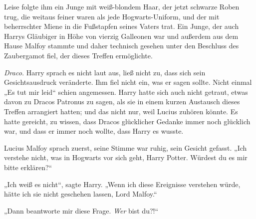 Leise folgte ihm ein Junge mit weiß-blondem Haar, der jetzt schwarze Roben trug, die weitaus feiner waren als jede Hogwarts-Uniform, und der mit beherrschter Miene in die Fußstapfen seines Vaters trat. Ein Junge, der auch Harrys Gläubiger in Höhe von vierzig Galleonen war und außerdem aus dem Hause Malfoy stammte und daher technisch gesehen unter den Beschluss des Zaubergamot fiel, der dieses Treffen ermöglichte.

\emph{Draco.}
Harry sprach es nicht laut aus, ließ nicht zu, dass sich sein Gesichtsausdruck veränderte. Ihm fiel nicht ein, was er sagen sollte. Nicht einmal „Es tut mir leid“ schien angemessen. Harry hatte sich auch nicht getraut, etwas davon zu Dracos Patronus zu sagen, als sie in einem kurzen Austausch dieses Treffen arrangiert hatten; und das nicht nur, weil Lucius zuhören könnte. Es hatte gereicht, zu wissen, dass Dracos glücklicher Gedanke immer noch glücklich war, und dass er immer noch wollte, dass Harry es wusste.

Lucius Malfoy sprach zuerst, seine Stimme war ruhig, sein Gesicht gefasst. „Ich verstehe nicht, was in Hogwarts vor sich geht, Harry Potter. Würdest du es mir bitte erklären?“

„Ich weiß es nicht“, sagte Harry. „Wenn ich diese Ereignisse verstehen würde, hätte ich sie nicht geschehen lassen, Lord Malfoy.“

„Dann beantworte mir diese Frage. \emph{Wer} bist du?!“

